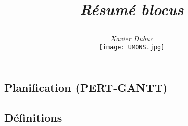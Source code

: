 \documentclass{article}
\title{$ $\\ $ $\\ $ $\\ $ $\\ $ $\\ $ $\\ $ $\\\begin{Huge}\maintitlecolor{Gestion de projets logiciels}\end{Huge} \\ 
   $ $ \\ \begin{LARGE}\textit{Résumé blocus}\end{LARGE}}
\author{\textit{Xavier Dubuc} \\$ $ \\$ $ \\$ $\\ $ $\\ $ $\\ $ $\\ $ $\\ $ $\\ $ $\\ $ 
$ \\ 
\texttt{[image: UMONS.jpg]}}
\begin{document}
\begin{sffamily}

\maketitle

\newpage

\tableofcontents

\hbox{\raisebox{0.4em}{\vrule depth 0.4pt height 0.4pt width 10cm}}

\newpage

\section{Planification (PERT-GANTT)}

\subsection{Définitions}


\end{sffamily}
\end{document}
